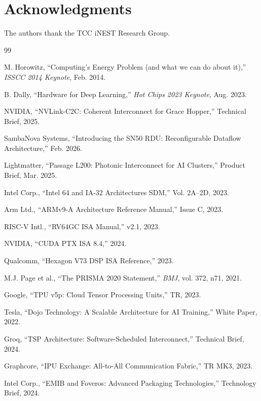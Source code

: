 ﻿\documentclass[review,3p,twocolumn]{elsarticle}
\begin{document}
\section*{Acknowledgments}
The authors thank the TCC iNEST Research Group.


\begin{thebibliography}{99}

 M. Horowitz, ``Computing's Energy Problem (and what we can do about it),'' \emph{ISSCC 2014 Keynote}, Feb. 2014.

 B. Dally, ``Hardware for Deep Learning,'' \emph{Hot Chips 2023 Keynote}, Aug. 2023.

 NVIDIA, ``NVLink-C2C: Coherent Interconnect for Grace Hopper,'' Technical Brief, 2025.

 SambaNova Systems, ``Introducing the SN50 RDU: Reconfigurable Dataflow Architecture,'' Feb. 2026.

 Lightmatter, ``Passage L200: Photonic Interconnect for AI Clusters,'' Product Brief, Mar. 2025.

 Intel Corp., ``Intel 64 and IA-32 Architectures SDM,'' Vol. 2A--2D, 2023.

 Arm Ltd., ``ARMv9-A Architecture Reference Manual,'' Issue C, 2023.

 RISC-V Intl., ``RV64GC ISA Manual,'' v2.1, 2023.

 NVIDIA, ``CUDA PTX ISA 8.4,'' 2024.

 Qualcomm, ``Hexagon V73 DSP ISA Reference,'' 2023.

 M.J. Page et al., ``The PRISMA 2020 Statement,'' \emph{BMJ}, vol. 372, n71, 2021.

 Google, ``TPU v5p: Cloud Tensor Processing Units,'' TR, 2023.

 Tesla, ``Dojo Technology: A Scalable Architecture for AI Training,'' White Paper, 2022.

 Groq, ``TSP Architecture: Software-Scheduled Interconnect,'' Technical Brief, 2024.

 Graphcore, ``IPU Exchange: All-to-All Communication Fabric,'' TR MK3, 2023.

 Intel Corp., ``EMIB and Foveros: Advanced Packaging Technologies,'' Technology Brief, 2024.


\end{thebibliography}
\end{document}
